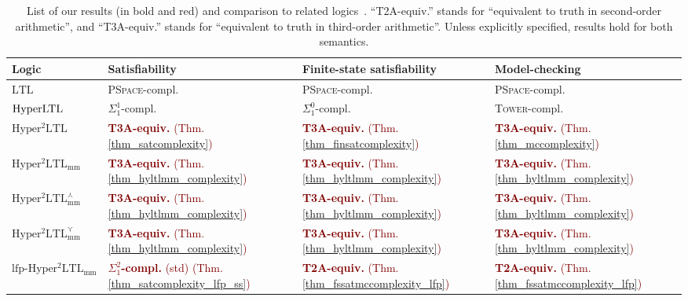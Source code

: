 \documentclass[dvipsnames,10pt,a4paper]{amsart}
\theoremstyle{definition}
\theoremstyle{remark}
\newcommand{\ltl}{\mathrm{LTL}\xspace}
\newcommand{\hyltl}{\mathrm{Hyper\-LTL}\xspace}
\newcommand{\sohyltl}{\mathrm{Hyper^2LTL}\xspace}
\newcommand{\sohyltlfp}{\mathrm{Hyper^2LTL_{\mathrm{mm}}}\xspace}
\newcommand{\sohyltlfpmax}{\mathrm{Hyper^2LTL_{\mathrm{mm}}^{\largest}}\xspace}
\newcommand{\sohyltlfpmin}{\mathrm{Hyper^2LTL_{\mathrm{mm}}^{\smallest}}\xspace}
\newcommand{\lfpsohyltlfp}{\mathrm{lfp\text{-}{Hyper^2LTL_{\mathrm{mm}}}}\xspace}
\newcommand{\smallest}{\curlyvee}
\newcommand{\largest}{\curlywedge}
\newcommand{\pspace}{\textsc{PSpace}\xspace}
\newcommand{\tower}{\textsc{Tower}\xspace}
\newcommand{\myquot}[1]{``#1''}
\begin{document}
\begin{table}[h]
    \centering
    \caption{List of our results (in bold and red) and comparison to related logics~\cite{FinkbeinerH16,hyperltlsat,sohypercomplexity,regaud2024complexityhyperqptl}. \myquot{T2A-equiv.} stands for \myquot{equivalent to truth in second-order arithmetic}, and \myquot{T3A-equiv.} stands for \myquot{equivalent to truth in third-order arithmetic}. Unless explicitly specified, results hold for both semantics.}
    \renewcommand{\arraystretch}{1.25}
    \setlength{\tabcolsep}{1pt}
    \footnotesize
    \begin{tabular}{llll}
       Logic &  Satisfiability  &  Finite-state satisfiability  &  Model-checking \\
         \midrule
        $\ltl$ &  \pspace-compl.~\cite{SistlaC85} &  \pspace-compl.~\cite{SistlaC85} &  \pspace-compl.~\cite{SistlaC85} \\
        \rowcolor{lightgray!40}$\hyltl$ & $\Sigma_1^1$-compl.~\cite{hyperltlsatconf}  & $\Sigma_1^0$-compl.~\cite{FinkbeinerH16,hyperltlsat}  & \tower-compl.~\cite{Rabe16diss,MZ20} \\
            $\sohyltl$ &  \textcolor{Maroon}{\textbf{T3A-equiv.} (Thm.\ref{thm_satcomplexity})} &  \textcolor{Maroon}{\textbf{T3A-equiv.} (Thm.\ref{thm_finsatcomplexity})} &  \textcolor{Maroon}{\textbf{T3A-equiv.} (Thm.\ref{thm_mccomplexity})}\\
        \rowcolor{lightgray!40}$\sohyltlfp$ &  \textcolor{Maroon}{\textbf{T3A-equiv.} (Thm.\ref{thm_hyltlmm_complexity})} &  \textcolor{Maroon}{\textbf{T3A-equiv.} (Thm.\ref{thm_hyltlmm_complexity})} &  \textcolor{Maroon}{\textbf{T3A-equiv.} (Thm.\ref{thm_hyltlmm_complexity})}\\
        $\sohyltlfpmax$ &  \textcolor{Maroon}{\textbf{T3A-equiv.} (Thm.\ref{thm_hyltlmm_complexity})} &    \textcolor{Maroon}{\textbf{T3A-equiv.} (Thm.\ref{thm_hyltlmm_complexity})} &    \textcolor{Maroon}{\textbf{T3A-equiv.} (Thm.\ref{thm_hyltlmm_complexity})}\\
        \rowcolor{lightgray!40}$\sohyltlfpmin$ &    \textcolor{Maroon}{\textbf{T3A-equiv.} (Thm.\ref{thm_hyltlmm_complexity})} &    \textcolor{Maroon}{\textbf{T3A-equiv.} (Thm.\ref{thm_hyltlmm_complexity})} &    \textcolor{Maroon}{\textbf{T3A-equiv.} (Thm.\ref{thm_hyltlmm_complexity})}\\
        $\lfpsohyltlfp$ &  \textcolor{Maroon}{\textbf{\boldmath$\Sigma_1^2$-compl.} (std) (Thm.\ref{thm_satcomplexity_lfp_ss})} &    \textcolor{Maroon}{\textbf{T2A-equiv.} (Thm.\ref{thm_fssatmccomplexity_lfp})} &    \textcolor{Maroon}{\textbf{T2A-equiv.} (Thm.\ref{thm_fssatmccomplexity_lfp})}\\

\end{tabular}
\end{table}
\end{document}
